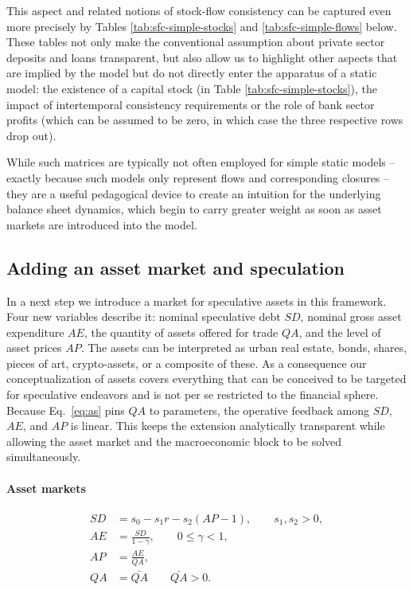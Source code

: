 \documentclass[12pt,a4paper]{article}
\begin{document}
This aspect and related notions of stock-flow consistency can be captured even more precisely by Tables \ref{tab:sfc-simple-stocks} and \ref{tab:sfc-simple-flows} below. These tables not only make the conventional assumption about private sector deposits and loans transparent, but also allow us to highlight other aspects that are implied by the model but do not directly enter the apparatus of a static model: the existence of a capital stock (in Table \ref{tab:sfc-simple-stocks}), the impact of intertemporal consistency requirements or the role of bank sector profits (which can be assumed to be zero, in which case the three respective rows drop out).

While such matrices are typically not often employed for simple static models -- exactly because such models only represent flows and corresponding closures -- they are a useful pedagogical device to create an intuition for the underlying balance sheet dynamics, which begin to carry greater weight as soon as asset markets are introduced into the model.





\subsection{Adding an asset market and speculation} \label{subsec:asset_market}

In a next step we introduce a market for speculative assets in this framework. Four new variables describe it: nominal speculative debt $SD$, nominal gross asset expenditure $AE$, the quantity of assets offered for trade $QA$, and the level of asset prices $AP$. The assets can be interpreted as urban real estate, bonds, shares, pieces of art, crypto-assets, or a composite of these. As a consequence our conceptualization of assets covers everything that can be conceived to be targeted for speculative endeavors and is not per se restricted to the financial sphere. Because Eq.~\ref{eq:as} pins $QA$ to parameters, the operative feedback among $SD$, $AE$, and $AP$ is linear. This keeps the extension analytically transparent while allowing the asset market and the macroeconomic block to be solved simultaneously.


\paragraph{Asset markets}
\begin{align}
  SD &= s_0-s_1r-s_2(AP-1), \qquad s_1,s_2>0, \label{eq:sd} \\
  AE &= \frac{SD}{1-\gamma}, \qquad 0\leq\gamma<1, \label{eq:ad} \\
  AP &= \frac{AE}{QA}, \label{eq:ap} \\
  QA &= \bar{QA} \qquad \bar{QA} > 0 . \label{eq:as}
\end{align}
\end{document}
